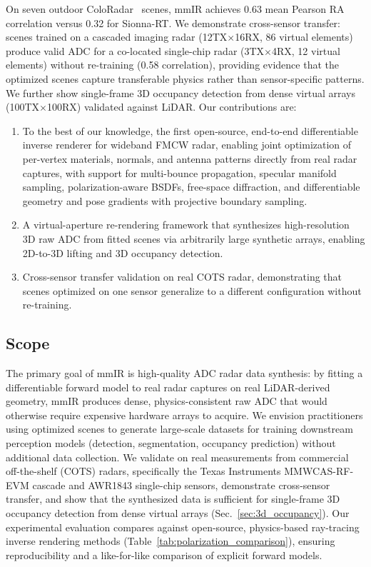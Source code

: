 On seven outdoor ColoRadar~\cite{kramer2022coloradar} scenes, mmIR achieves 0.63 mean Pearson RA correlation versus 0.32 for Sionna-RT. We demonstrate cross-sensor transfer: scenes trained on a cascaded imaging radar (12TX$\times$16RX, 86 virtual elements) produce valid ADC for a co-located single-chip radar (3TX$\times$4RX, 12 virtual elements) without re-training (0.58 correlation), providing evidence that the optimized scenes capture transferable physics rather than sensor-specific patterns. We further show single-frame 3D occupancy detection from dense virtual arrays (100TX$\times$100RX) validated against LiDAR. Our contributions are:

\begin{enumerate}
\item To the best of our knowledge, the first open-source, end-to-end differentiable inverse renderer for wideband FMCW radar, enabling joint optimization of per-vertex materials, normals, and antenna patterns directly from real radar captures, with support for multi-bounce propagation, specular manifold sampling, polarization-aware BSDFs, free-space diffraction, and differentiable geometry and pose gradients with projective boundary sampling.
\item A virtual-aperture re-rendering framework that synthesizes high-resolution 3D raw ADC from fitted scenes via arbitrarily large synthetic arrays, enabling 2D-to-3D lifting and 3D occupancy detection.
\item Cross-sensor transfer validation on real COTS radar, demonstrating that scenes optimized on one sensor generalize to a different configuration without re-training.
\end{enumerate}

\subsection{Scope}
\label{sec:scope}

The primary goal of mmIR is high-quality ADC radar data synthesis: by fitting a differentiable forward model to real radar captures on real LiDAR-derived geometry, mmIR produces dense, physics-consistent raw ADC that would otherwise require expensive hardware arrays to acquire. We envision practitioners using optimized scenes to generate large-scale datasets for training downstream perception models (detection, segmentation, occupancy prediction) without additional data collection. We validate on real measurements from commercial off-the-shelf (COTS) radars, specifically the Texas Instruments MMWCAS-RF-EVM cascade and AWR1843 single-chip sensors, demonstrate cross-sensor transfer, and show that the synthesized data is sufficient for single-frame 3D occupancy detection from dense virtual arrays (Sec.~\ref{sec:3d_occupancy}). Our experimental evaluation compares against open-source, physics-based ray-tracing inverse rendering methods (Table~\ref{tab:polarization_comparison}), ensuring reproducibility and a like-for-like comparison of explicit forward models.
